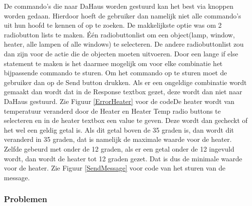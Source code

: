\documentclass[11pt]{article}
\begin{document}
	De commando's die naar DaHaus worden gestuurd kan het best via knoppen worden gedaan. Hierdoor hoeft de gebruiker dan namelijk niet alle commando's uit hun hoofd te kennen of op te zoeken. De makkelijkste optie was om 2 radiobutton lists te maken. \'{E}\'{e}n radiobuttonlist om een object(lamp, window, heater, alle lampen of alle windows) te selecteren. De andere radiobuttonlist zou dan zijn voor de actie die de objecten moeten uitvoeren. Door een lange if else statement te maken is het daarmee mogelijk om voor elke combinatie het bijpassende commando te sturen. Om het commando op te sturen moet de gebruiker dan op de Send button drukken. Als er een ongeldige combinatie wordt gemaakt dan wordt dat in de Response textbox gezet, deze wordt dan niet naar DaHaus gestuurd. Zie Figuur \ref{ErrorHeater} voor de codeDe heater wordt van temperatuur veranderd door de Heater en Heater Temp radio buttons te selecteren en in de heater textbox een value te geven. Deze wordt dan gecheckt of het wel een geldig getal is. Als dit getal boven de 35 graden is, dan wordt dit veranderd in 35 graden, dat is namelijk de maximale waarde voor de heater. Zelfde gebeurd met onder de 12 graden, als er een getal onder de 12 ingevuld wordt, dan wordt de heater tot 12 graden gezet. Dat is dus de minimale waarde voor de heater. Zie Figuur \ref{SendMessage} voor code van het sturen van de message.
	\subsubsection{Problemen}
	
\end{document}
